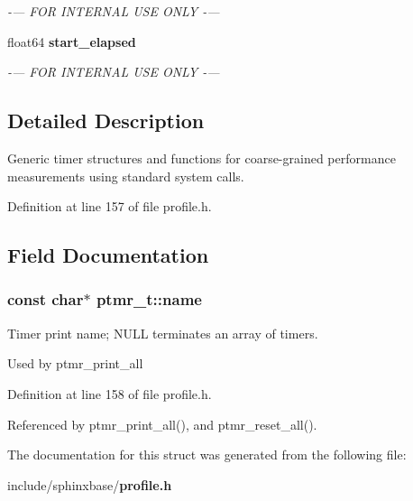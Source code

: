 \begin{DoxyCompactItemize}
\begin{DoxyCompactList}\small\item\em -\/--- F\+O\+R I\+N\+T\+E\+R\+N\+A\+L U\+S\+E O\+N\+L\+Y -\/--- \end{DoxyCompactList}\item 
float64 {\bf start\+\_\+elapsed}\label{structptmr__t_a1702b16a6c6bcb82f6c636f5e68af188}

\begin{DoxyCompactList}\small\item\em -\/--- F\+O\+R I\+N\+T\+E\+R\+N\+A\+L U\+S\+E O\+N\+L\+Y -\/--- \end{DoxyCompactList}\end{DoxyCompactItemize}


\subsection{Detailed Description}
Generic timer structures and functions for coarse-\/grained performance measurements using standard system calls. 

Definition at line 157 of file profile.\+h.



\subsection{Field Documentation}
\subsubsection[{name}]{\setlength{\rightskip}{0pt plus 5cm}const char$\ast$ ptmr\+\_\+t\+::name}\label{structptmr__t_a73b51c5a047300d77b3a82a7dcaf44f1}


Timer print name; N\+U\+L\+L terminates an array of timers. 

Used by ptmr\+\_\+print\+\_\+all 

Definition at line 158 of file profile.\+h.



Referenced by ptmr\+\_\+print\+\_\+all(), and ptmr\+\_\+reset\+\_\+all().



The documentation for this struct was generated from the following file\+:\begin{DoxyCompactItemize}
\item 
include/sphinxbase/{\bf profile.\+h}\end{DoxyCompactItemize}
